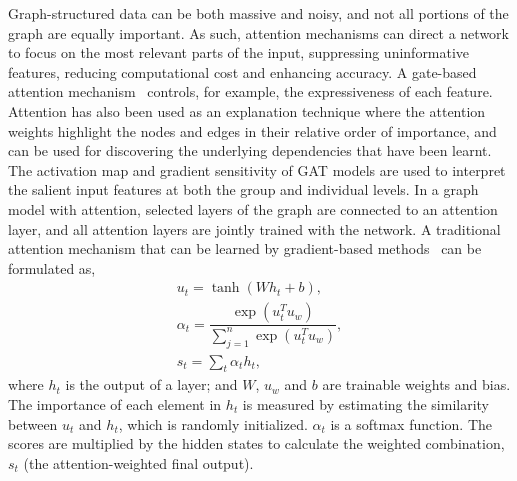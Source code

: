 Graph-structured data can be both massive and noisy, and not all portions of the graph are equally important. As such, attention mechanisms can direct a network to focus on the most relevant parts of the input, suppressing uninformative features, reducing computational cost and enhancing accuracy. 
A gate-based attention mechanism{~} controls, for example, the expressiveness of each feature.
Attention has also been used as an explanation technique where the attention weights highlight the nodes and edges in their relative order of importance, and can be used for discovering the underlying dependencies that have been learnt.
The activation map and gradient sensitivity of GAT models are used to interpret the salient input features at both the group and individual levels.
In a graph model with attention, selected layers of the graph are connected to an attention layer, and all attention layers are jointly trained with the network. A traditional attention mechanism that can be learned by gradient-based methods{~} can be formulated as,
\vspace{-4pt}
\begin{equation}
\begin{split}
u_t = \tanh ( W h_t + b), \\
\alpha_t = \dfrac{\exp(u_t^Tu_w)}{\sum_{j=1}^{n} \exp(u_t^Tu_w)} , \\
s_t = \sum_{t} \alpha_t h_t ,
\end{split}
\end{equation}
where $h_t$ is the output of a layer; and $W$, $u_w$ and $b$ are trainable weights and bias. The importance of each element in $h_t$ is measured by estimating the similarity between $u_t$ and $h_t$, which is randomly initialized. $\alpha_t$ is a softmax function. The scores are multiplied by the hidden states to calculate the weighted combination, $s_t$ (the attention-weighted final output).

